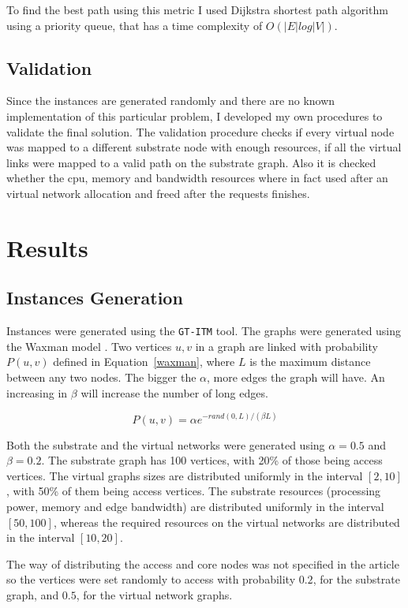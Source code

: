 \documentclass[11pt, a4paper]{article}
\begin{document}
To find the best path using this metric I used Dijkstra shortest path algorithm using a priority queue, that has a time complexity of $O(|E| log |V|)$.

\subsection{Validation}
Since the instances are generated randomly and there are no known implementation of this particular problem, I developed my own procedures to validate the final solution. The validation procedure checks if every virtual node was mapped to a different substrate node with enough resources, if all the virtual links were mapped to a valid path on the substrate graph. Also  it is checked whether the cpu, memory and bandwidth resources where in fact used after an virtual network allocation and freed after the requests finishes.

\section{Results}
\subsection{Instances Generation}
Instances were generated using the \texttt{GT-ITM} tool. The graphs were generated using the Waxman model \cite{waxman88}. Two vertices $u, v$ in a graph are linked with probability $P(u,v)$ defined in Equation~\ref{waxman}, where $L$ is the maximum distance between any two nodes. The bigger the $\alpha$, more edges the graph will have. An increasing in $\beta$ will increase the number of long edges.

\begin{equation}
  P(u,v) = \alpha e^{-rand(0,L)/(\beta L)} \label{waxman}
\end{equation}

Both the substrate and the virtual networks were generated using $\alpha = 0.5$ and $\beta = 0.2$. The substrate graph has 100 vertices, with 20\% of those being access vertices. The virtual graphs sizes are distributed uniformly in the interval $[2,10]$, with 50\% of them being access vertices. The substrate resources (processing power, memory and edge bandwidth) are distributed uniformly in the interval $[50,100]$, whereas the required resources on the virtual networks are distributed in the interval $[10,20]$.

The way of distributing the access and core nodes was not specified in the article so the vertices were set randomly to access with probability $0.2$, for the substrate graph, and $0.5$, for the virtual network graphs.
\end{document}
